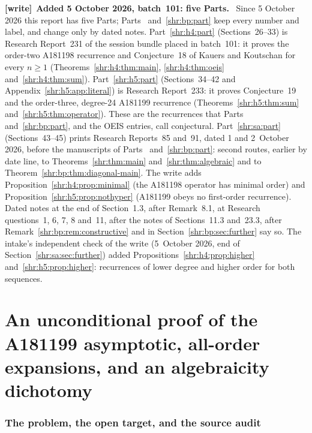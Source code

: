 \documentclass[11pt,letterpaper]{article}
\numberwithin{equation}{section}
\theoremstyle{definition}
\newcommand{\1}{\mathbf 1}
\newenvironment{writenote}[1][]{\par\smallskip\begingroup\small
 \noindent\textbf{[write]}\if\relax\detokenize{#1}\relax\else~\textbf{#1.}\fi\ }%
 {\par\endgroup\smallskip}
\begin{document}
\begin{writenote}[Added 5 October 2026, batch~101: five Parts]
Since 5 October 2026 this report has five Parts; Parts~\ref{shr:part:one}
and~\ref{shr:bp:part} keep every number and label, and change only by
dated notes. Part~\ref{shr:h4:part} (Sections~26--33) is Research
Report~231 of the session bundle placed in batch~101: it proves the
order-two A181198 recurrence and Conjecture~18 of Kauers and Koutschan
\cite{KK} for every $n\ge1$ (Theorems~\ref{shr:h4:thm:main},
\ref{shr:h4:thm:oeis} and~\ref{shr:h4:thm:sum}). Part~\ref{shr:h5:part}
(Sections~34--42 and Appendix~\ref{shr:h5:app:literal}) is Research
Report~233: it proves Conjecture~19 and the order-three, degree-24
A181199 recurrence (Theorems~\ref{shr:h5:thm:sum}
and~\ref{shr:h5:thm:operator}). These are the recurrences that
Parts~\ref{shr:part:one} and~\ref{shr:bp:part}, and the OEIS entries, call
conjectural. Part~\ref{shr:sa:part} (Sections~43--45) prints Research
Reports~85 and~91, dated 1 and 2~October 2026, before the manuscripts of
Parts~\ref{shr:part:one} and~\ref{shr:bp:part}: second routes, earlier by
date line, to Theorems~\ref{shr:thm:main} and~\ref{shr:thm:algebraic} and
to Theorem~\ref{shr:bp:thm:diagonal-main}. The write adds
Proposition~\ref{shr:h4:prop:minimal} (the A181198 operator has minimal
order) and Proposition~\ref{shr:h5:prop:nothyper} (A181199 obeys no
first-order recurrence). Dated notes at the end of Section~1.3, after
Remark~8.1, at Research questions~1, 6, 7, 8 and~11, after the notes of
Sections~11.3 and~23.3, after Remark~\ref{shr:bp:rem:constructive} and in
Section~\ref{shr:bp:sec:further} say so. The intake's independent check
of the write (5~October 2026, end of Section~\ref{shr:sa:sec:further})
added Propositions~\ref{shr:h4:prop:higher} and~\ref{shr:h5:prop:higher}:
recurrences of lower degree and higher order for both sequences.
\end{writenote}

{\fontsize{9.5}{10.5}\selectfont\setlength{\parskip}{0pt}\tableofcontents}
\newpage

\part{An unconditional proof of the A181199 asymptotic, all-order expansions, and an algebraicity dichotomy}
\label{shr:part:one}

\section{The problem, the open target, and the source audit}
\end{document}
